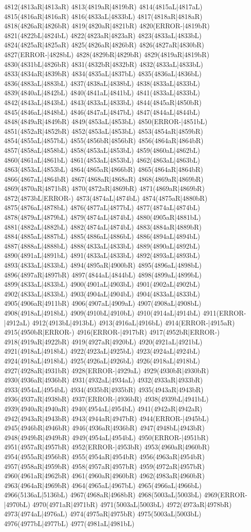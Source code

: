 4812(4813aR|4813aR) 4813(4819aR|4819bR) 4814(4815aL|4817aL) 4815(4816aR|4816aR) 4816(4833aL|4833bL) 4817(4818aR|4818aR) 4818(4826aR|4826bR) 4819(4820aR|4821bR) 4820(ERROR-|4819bR) 4821(4822bL|4824bL) 4822(4823aR|4823aR) 4823(4833aL|4833bL) 4824(4825aR|4825aR) 4825(4826aR|4826bR) 4826(4827aR|4830bR) 4827(ERROR-|4828bL) 4828(4829bR|4829bR) 4829(4819aR|4819bR) 4830(4831bL|4826bR) 4831(4832bR|4832bR) 4832(4833aL|4833bL) 4833(4834aR|4839bR) 4834(4835aL|4837bL) 4835(4836aL|4836bL) 4836(4883aL|4883bL) 4837(4838aL|4838bL) 4838(4833aL|4833bL) 4839(4840aL|4842bL) 4840(4841aL|4841bL) 4841(4833aL|4833bL) 4842(4843aL|4843bL) 4843(4833aL|4833bL) 4844(4845aR|4850bR) 4845(4846aL|4848bL) 4846(4847aL|4847bL) 4847(4844aL|4844bL) 4848(4849aR|4849bR) 4849(4853aL|4853bL) 4850(ERROR-|4851bL) 4851(4852aR|4852bR) 4852(4853aL|4853bL) 4853(4854aR|4859bR) 4854(4855aL|4857bL) 4855(4856bR|4856bR) 4856(4864aR|4864bR) 4857(4858aL|4858bL) 4858(4853aL|4853bL) 4859(4860aL|4862bL) 4860(4861aL|4861bL) 4861(4853aL|4853bL) 4862(4863aL|4863bL) 4863(4853aL|4853bL) 4864(4865aR|4866bR) 4865(4864aR|4864bR) 4866(4867aL|4864bR) 4867(4868aR|4868aR) 4868(4869aR|4869bR) 4869(4870aR|4871bR) 4870(4872aR|4869bR) 4871(4869aR|4869bR) 4872(4873bL|ERROR-) 4873(4874aL|4874bL) 4874(4875aR|4880bR) 4875(4876aL|4878bL) 4876(4877aL|4877bL) 4877(4874aL|4874bL) 4878(4879aL|4879bL) 4879(4874aL|4874bL) 4880(4905aR|4881bL) 4881(4882aL|4882bL) 4882(4874aL|4874bL) 4883(4884aR|4889bR) 4884(4885aL|4887bL) 4885(4886aL|4886bL) 4886(4894aL|4894bL) 4887(4888aL|4888bL) 4888(4833aL|4833bL) 4889(4890aL|4892bL) 4890(4891aL|4891bL) 4891(4833aL|4833bL) 4892(4893aL|4893bL) 4893(4833aL|4833bL) 4894(4895aR|4900bR) 4895(4896aL|4898bL) 4896(4897aR|4897bR) 4897(4844aL|4844bL) 4898(4899aL|4899bL) 4899(4833aL|4833bL) 4900(4901aL|4903bL) 4901(4902aL|4902bL) 4902(4833aL|4833bL) 4903(4904aL|4904bL) 4904(4833aL|4833bL) 4905(4906aR|4911bR) 4906(4907aL|4909aL) 4907(4908aL|4908bL) 4908(4918aL|4918bL) 4909(4910bL|4910bL) 4910(4914aL|4914bL) 4911(ERROR-|4912aL) 4912(4913bL|4913bL) 4913(4916aL|4916bL) 4914(ERROR-|4915aR) 4915(4950bR|ERROR-) 4916(ERROR-|4917bR) 4917(4952bR|ERROR-) 4918(4919aR|4922bR) 4919(4927aR|4920bL) 4920(4921aL|4921bL) 4921(4918aL|4918bL) 4922(4923aL|4925bL) 4923(4924aL|4924bL) 4924(4918aL|4918bL) 4925(4926aL|4926bL) 4926(4918aL|4918bL) 4927(4928aR|4931bR) 4928(ERROR-|4929aL) 4929(4930bR|4930bR) 4930(4936aR|4936bR) 4931(4932aL|4934aL) 4932(4933aR|4933bR) 4933(4954aL|4954bL) 4934(4935bR|4935bR) 4935(4943aR|4943bR) 4936(4937aR|4938bR) 4937(ERROR-|4936bR) 4938(4939bL|4941bL) 4939(4940aR|4940aR) 4940(4954aL|4954bL) 4941(4942aR|4942aR) 4942(4943aR|4943bR) 4943(4944aR|4947bR) 4944(ERROR-|4945bL) 4945(4946bR|4946bR) 4946(4936aR|4936bR) 4947(4948bL|4943bR) 4948(4949bR|4949bR) 4949(4954aL|4954bL) 4950(ERROR-|4951bR) 4951(4957aR|4957bR) 4952(ERROR-|4953bR) 4953(4960aR|4960bR) 4954(4955aR|4956bR) 4955(4954aR|4954bR) 4956(4963aR|4954bR) 4957(4958aR|4959bR) 4958(4957aR|4957bR) 4959(4972aR|4957bR) 4960(4961aR|4962bR) 4961(4960aR|4960bR) 4962(4983aR|4960bR) 4963(4964aR|4969bR) 4964(4965aL|4967bL) 4965(4966aL|4966bL) 4966(5136aL|5136bL) 4967(4968aR|4968bR) 4968(5003aL|5003bL) 4969(ERROR-|4970bL) 4970(4971aR|4971bR) 4971(5003aL|5003bL) 4972(4973aR|4978bR) 4973(4974aL|4976aL) 4974(4975aR|4975bR) 4975(5003aL|5003bL) 4976(4977bL|4977bL) 4977(4981aL|4981bL) 